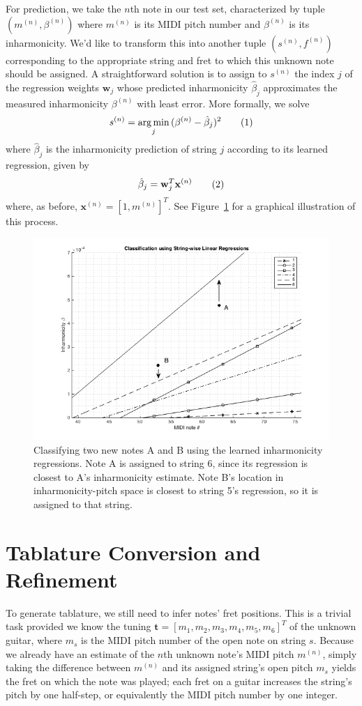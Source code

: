 \documentclass[12pt]{cmuthesis}
\DeclareMathOperator*{\argmin}{arg\,min}
\newcommand\addtag{\refstepcounter{equation}\tag{\theequation}}
\begin{document}
For prediction, we take the $n$th note in our test set, characterized by tuple $(m^{(n)},\beta^{(n)})$ where $m^{(n)}$ is its MIDI pitch number and $\beta^{(n)}$ is its inharmonicity. We'd like to transform this into another tuple $(s^{(n)},f^{(n)})$ corresponding to the appropriate string and fret to which this unknown note should be assigned. A straightforward solution is to assign to $s^{(n)}$ the index $j$ of the regression weights $\mathbf{w}_j$ whose predicted inharmonicity $\hat\beta_j$ approximates the measured inharmonicity $\beta^{(n)}$ with least error. More formally, we solve 
\[
s^{(n)} = \argmin_{j}{(\beta^{(n)} - \hat{\beta}_{j})^2} \addtag
\]
where $\hat\beta_j$ is the inharmonicity prediction of string $j$ according to its learned regression, given by
\[
\hat{\beta}_{j} = \mathbf{w}_{j}^T\mathbf{x}^{(n)} \addtag
\]
where, as before, $\mathbf{x}^{(n)} = [1, m^{(n)}]^T$. See Figure~\ref{fig:classification} for a graphical illustration of this process.

\begin{figure}[h] 
\label{fig:classification}
\centering
\includegraphics[scale=0.75]{classification}
\caption{Classifying two new notes A and B using the learned inharmonicity regressions. Note A is assigned to string 6, since its regression is closest to A's inharmonicity estimate. Note B's location in inharmonicity-pitch space is closest to string 5's regression, so it is assigned to that string.}
\end{figure}

\section{Tablature Conversion and Refinement}
To generate tablature, we still need to infer notes' fret positions. This is a trivial task provided we know the tuning $\mathbf{t} = [m_1, m_2, m_3, m_4, m_5, m_6]^T$ of the unknown guitar, where $m_s$ is the MIDI pitch number of the open note on string $s$. Because we already have an estimate of the $n$th unknown note's MIDI pitch $m^{(n)}$, simply taking the difference between $m^{(n)}$ and its assigned string's open pitch $m_s$ yields the fret on which the note was played; each fret on a guitar increases the string's pitch by one half-step, or equivalently the MIDI pitch number by one integer.
\end{document}
